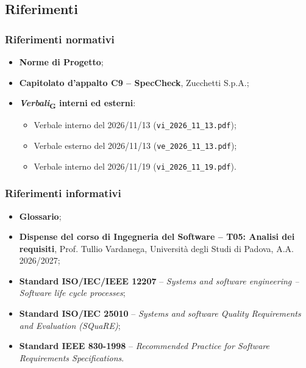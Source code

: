 \documentclass[11pt, a4paper]{article}
\newcommand{\glossario}[1]{\textit{#1}\textsubscript{G}}
\begin{document}
\subsection{Riferimenti}

\subsubsection{Riferimenti normativi}
\begin{itemize}
    \item \textbf{Norme di Progetto};
    \item \textbf{Capitolato d'appalto C9 -- SpecCheck}, Zucchetti S.p.A.;
    \item \textbf{\glossario{Verbali} interni ed esterni}:
    \begin{itemize}
        \item Verbale interno del 2026/11/13 (\texttt{vi\_2026\_11\_13.pdf});
        \item Verbale esterno del 2026/11/13 (\texttt{ve\_2026\_11\_13.pdf});
        \item Verbale interno del 2026/11/19 (\texttt{vi\_2026\_11\_19.pdf}).
    \end{itemize}
\end{itemize}

\subsubsection{Riferimenti informativi}
\begin{itemize}
    \item \textbf{Glossario};
    \item \textbf{Dispense del corso di Ingegneria del Software -- T05: Analisi dei requisiti}, Prof. Tullio Vardanega, Università degli Studi di Padova, A.A. 2026/2027;
    \item \textbf{Standard ISO/IEC/IEEE 12207} -- \textit{Systems and software engineering -- Software life cycle processes};
    \item \textbf{Standard ISO/IEC 25010} -- \textit{Systems and software Quality Requirements and Evaluation (SQuaRE)};
    \item \textbf{Standard IEEE 830-1998} -- \textit{Recommended Practice for Software Requirements Specifications}.
\end{itemize}

\newpage

\end{document}
